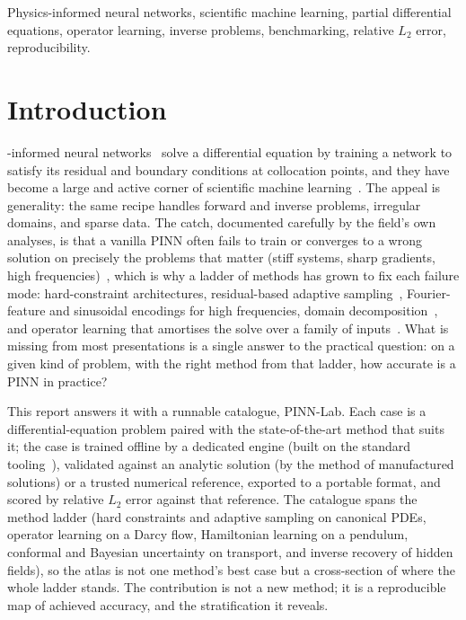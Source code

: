 \documentclass[journal]{IEEEtran}
\begin{document}
\begin{IEEEkeywords}
Physics-informed neural networks, scientific machine learning, partial differential equations, operator learning,
inverse problems, benchmarking, relative $L_2$ error, reproducibility.
\end{IEEEkeywords}

\section{Introduction}

-informed neural networks~\cite{raissi} solve a differential equation by training a network
to satisfy its residual and boundary conditions at collocation points, and they have become a large and active
corner of scientific machine learning~\cite{karniadakis}. The appeal is generality: the same recipe handles
forward and inverse problems, irregular domains, and sparse data. The catch, documented carefully by the field's
own analyses, is that a vanilla PINN often fails to train or converges to a wrong solution on precisely the
problems that matter (stiff systems, sharp gradients, high frequencies)~\cite{wang,krishnapriyan}, which is why a
ladder of methods has grown to fix each failure mode: hard-constraint architectures, residual-based adaptive
sampling~\cite{wu}, Fourier-feature and sinusoidal encodings for high frequencies, domain
decomposition~\cite{jagtap}, and operator learning that amortises the solve over a family of
inputs~\cite{fno,deeponet}. What is missing from most presentations is a single answer to the practical
question: on a given kind of problem, with the right method from that ladder, how accurate is a PINN in practice?

This report answers it with a runnable catalogue, PINN-Lab. Each case is a differential-equation problem paired
with the state-of-the-art method that suits it; the case is trained offline by a dedicated engine (built on the
standard tooling~\cite{deepxde}), validated against an analytic solution (by the method of manufactured
solutions) or a trusted numerical reference, exported to a portable format, and scored by relative $L_2$ error
against that reference. The catalogue spans the method ladder (hard constraints and adaptive sampling on
canonical PDEs, operator learning on a Darcy flow, Hamiltonian learning on a pendulum, conformal and Bayesian
uncertainty on transport, and inverse recovery of hidden fields), so the atlas is not one method's best case but a
cross-section of where the whole ladder stands. The contribution is not a new method; it is a
reproducible map of achieved accuracy, and the stratification it reveals.
\end{document}
